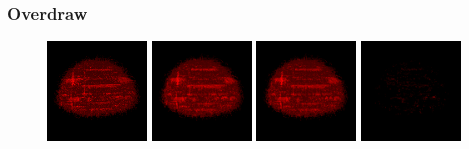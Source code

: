 \subsubsection*{Overdraw}

\begin{figure}[!htb]
  \centering  
  \includegraphics[height=100px]{images/graphics/overdraw-hairball1-nocull.png}
  \includegraphics[height=100px]{images/graphics/overdraw-hairball1-pooc.png}
  \includegraphics[height=100px]{images/graphics/overdraw-hairball1-pmoc.png}
  \includegraphics[height=100px]{images/graphics/overdraw-hairball1-diff.png}


\end{figure}
